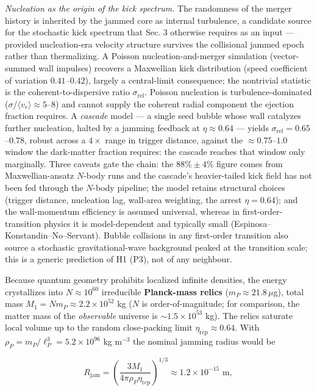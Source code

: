 \documentclass[
]{article}
\begin{document}
\emph{Nucleation as the origin of the kick spectrum.} The randomness of
the merger history is inherited by the jammed core as internal
turbulence, a candidate source for the stochastic kick spectrum that
Sec. 3 otherwise requires as an input --- provided nucleation-era
velocity structure survives the collisional jammed epoch rather than
thermalizing. A Poisson nucleation-and-merger simulation (vector-summed
wall impulses) recovers a Maxwellian kick distribution (speed
coefficient of variation \(0.41\)--\(0.42\)), largely a central-limit
consequence; the nontrivial statistic is the coherent-to-dispersive
ratio \(\sigma_{\text{rel}}\). Poisson nucleation is
turbulence-dominated (\(\sigma/\langle v_r\rangle \approx 5\)--\(8\))
and cannot supply the coherent radial component the ejection fraction
requires. A \emph{cascade} model --- a single seed bubble whose wall
catalyzes further nucleation, halted by a jamming feedback at
\(\eta \approx 0.64\) --- yields
\(\sigma_{\text{rel}} = 0.65\)--\(0.78\), robust across a \(4\times\)
range in trigger distance, against the \(\approx 0.75\)--\(1.0\) window
the dark-matter fraction requires: the cascade reaches that window only
marginally. Three caveats gate the chain: the \(88\% \pm 4\%\) figure
comes from Maxwellian-ansatz \(N\)-body runs and the cascade's
heavier-tailed kick field has not been fed through the \(N\)-body
pipeline; the model retains structural choices (trigger distance,
nucleation lag, wall-area weighting, the arrest \(\eta = 0.64\)); and
the wall-momentum efficiency is assumed universal, whereas in
first-order-transition physics it is model-dependent and typically small
(Espinosa--Konstandin--No--Servant). Bubble collisions in any
first-order transition also source a stochastic gravitational-wave
background peaked at the transition scale; this is a generic prediction
of H1 (P3), not of any neighbour.

Because quantum geometry prohibits localized infinite densities, the
energy crystallizes into \(N \approx 10^{60}\) irreducible
\textbf{Planck-mass relics} (\(m_P \approx 21.8\,\mu\)g), total mass
\(M_1 = N m_P \approx 2.2\times10^{52}\) kg (\(N\) is
order-of-magnitude; for comparison, the matter mass of the
\emph{observable} universe is \(\sim\!1.5\times10^{53}\) kg). The relics
saturate local volume up to the random close-packing limit
\(\eta_{\text{rcp}} \approx 0.64\). With
\(\rho_P = m_P/\ell_P^3 = 5.2\times10^{96}\) kg m\(^{-3}\) the nominal
jamming radius would be

\[R_{\text{jam}} = \left( \frac{3 M_1}{4 \pi \rho_P \eta_{\text{rcp}}} \right)^{1/3} \approx 1.2 \times 10^{-15} \text{ m},\]
\end{document}
